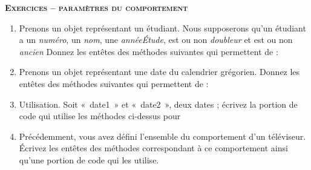 \clearpage

{\sffamily\bfseries\scshape
Exercices – paramètres du comportement}

\begin{enumerate}
	\item 
		Prenons un objet représentant un étudiant. 
		Nous supposerons qu'un étudiant a un \textit{numéro}, un 
		\textit{nom}, une \textit{annéeÉtude}, est ou non 
		\textit{doubleur} et est ou non \textit{ancien}
		Donnez les entêtes des méthodes suivantes qui permettent de
		:

			
	\item 
		Prenons un objet représentant une date du calendrier grégorien. 
		Donnez les entêtes des méthodes suivantes qui permettent de
		:

		
	\item 
		Utilisation. Soit «~date1~» et «~date2~», deux dates ; écrivez la
		portion de code qui utilise les méthodes ci-dessus pour
		
	
	\item 
		Précédemment, vous avez défini l'ensemble du
		comportement d'un téléviseur. Écrivez les entêtes des
		méthodes correspondant à ce comportement ainsi qu'une
		portion de code qui les utilise.
\end{enumerate}

